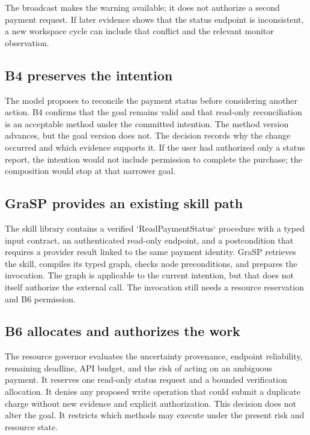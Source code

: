 The broadcast makes the warning available; it does not authorize a second payment request. If later evidence shows that the status endpoint is inconsistent, a new workspace cycle can include that conflict and the relevant monitor observation.

\subsection{B4 preserves the intention}
\label{subsec:ch18-productx-b4}

The model proposes to reconcile the payment status before considering another action. B4 confirms that the goal remains valid and that read-only reconciliation is an acceptable method under the committed intention. The method version advances, but the goal version does not. The decision records why the change occurred and which evidence supports it. If the user had authorized only a status report, the intention would not include permission to complete the purchase; the composition would stop at that narrower goal.

\subsection{GraSP provides an existing skill path}
\label{subsec:ch18-productx-grasp}

The skill library contains a verified `ReadPaymentStatus` procedure with a typed input contract, an authenticated read-only endpoint, and a postcondition that requires a provider result linked to the same payment identity. GraSP retrieves the skill, compiles its typed graph, checks node preconditions, and prepares the invocation. The graph is applicable to the current intention, but that does not itself authorize the external call. The invocation still needs a resource reservation and B6 permission.

\subsection{B6 allocates and authorizes the work}
\label{subsec:ch18-productx-b6}

The resource governor evaluates the uncertainty provenance, endpoint reliability, remaining deadline, API budget, and the risk of acting on an ambiguous payment. It reserves one read-only status request and a bounded verification allocation. It denies any proposed write operation that could submit a duplicate charge without new evidence and explicit authorization. This decision does not alter the goal. It restricts which methods may execute under the present risk and resource state.

